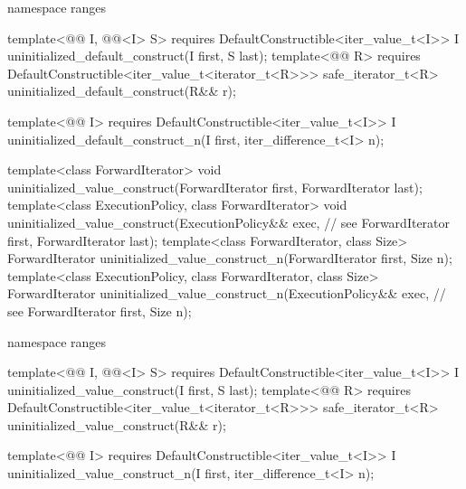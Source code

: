 \begin{addedblock}
\begin{codeblock}
  namespace ranges {
    template<@@ I, @@<I> S>
      requires DefaultConstructible<iter_value_t<I>>
        I uninitialized_default_construct(I first, S last);
    template<@@ R>
      requires DefaultConstructible<iter_value_t<iterator_t<R>>>
        safe_iterator_t<R> uninitialized_default_construct(R&& r);

    template<@@ I>
      requires DefaultConstructible<iter_value_t<I>>
        I uninitialized_default_construct_n(I first, iter_difference_t<I> n);
  }
\end{codeblock}
\end{addedblock}
\begin{codeblock}

  template<class ForwardIterator>
    void uninitialized_value_construct(ForwardIterator first, ForwardIterator last);
  template<class ExecutionPolicy, class ForwardIterator>
    void uninitialized_value_construct(ExecutionPolicy&& exec, // see 
                                       ForwardIterator first, ForwardIterator last);
  template<class ForwardIterator, class Size>
    ForwardIterator uninitialized_value_construct_n(ForwardIterator first, Size n);
  template<class ExecutionPolicy, class ForwardIterator, class Size>
    ForwardIterator uninitialized_value_construct_n(ExecutionPolicy&& exec, // see 
                                                    ForwardIterator first, Size n);
\end{codeblock}
\begin{addedblock}
\begin{codeblock}
  namespace ranges {
    template<@@ I, @@<I> S>
      requires DefaultConstructible<iter_value_t<I>>
        I uninitialized_value_construct(I first, S last);
    template<@@ R>
      requires DefaultConstructible<iter_value_t<iterator_t<R>>>
        safe_iterator_t<R> uninitialized_value_construct(R&& r);

    template<@@ I>
      requires DefaultConstructible<iter_value_t<I>>
        I uninitialized_value_construct_n(I first, iter_difference_t<I> n);
  }
\end{codeblock}
\end{addedblock}
